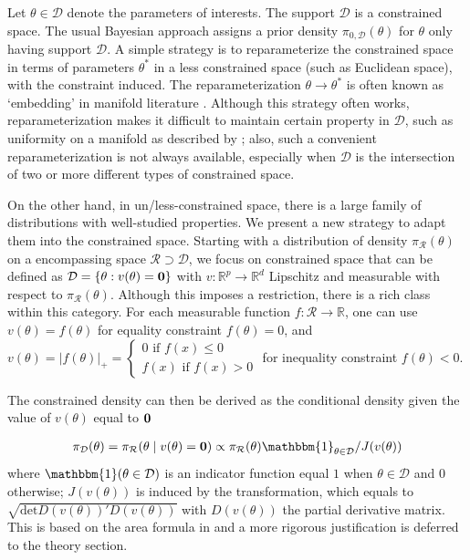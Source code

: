 \documentclass[10pt]{article}
\newcommand{\be}{\begin{equation}\begin{aligned}}
\newcommand{\ee}{\end{aligned}\end{equation}}
\newcommand{\bb}[1]{\mathbb{#1}}
\newcommand{\mc}[1]{\mathcal{#1}}
\DeclareMathOperator{\1}{\mathbbm{1}}
\begin{document}
Let $\theta \in \mc D$ denote the parameters of interests. The support $\mc
D$ is a constrained space. The usual Bayesian approach assigns a prior
density $\pi_{0,\mc D}(\theta)$ for $\theta$ only having support $\mc D$. A
simple strategy is to reparameterize the constrained space in terms of
parameters $\theta^*$ in a less constrained space (such as Euclidean
space), with the constraint induced. The reparameterization
$\theta\rightarrow\theta^*$ is often known as `embedding' in manifold
literature \citep{nash1954c1,nash1956imbedding}.  Although this strategy
often works, reparameterization makes it difficult to maintain certain
property in $\mc D$, such as uniformity on a manifold as described by
\cite{diaconis2013manifold}; also, such a convenient reparameterization is
not always available, especially when $\mc D$ is the intersection of two or
more different types of constrained space.

On the other hand, in un/less-constrained space, there is a large family of
distributions  with well-studied properties. We present a new strategy to
adapt them into the constrained space. Starting with a distribution of
density $\pi_{\mc R}(\theta)$ on a encompassing space $\mc R\supset \mc D$,
we focus on constrained space that can be defined as $\mc D =\{\theta:
v(\theta)={\bf 0}\}$ with $v: \bb{R}^p\rightarrow \bb  R^d$ Lipschitz and
measurable with respect to $\pi_{\mc R}(\theta)$. Although this imposes a
restriction, there is a rich class within this category. For each
measurable function $f:\mc R\rightarrow \bb R$, one can use
$v(\theta)=f(\theta)$ for equality constraint $f(\theta)=0$, and
$v(\theta)=|f(\theta)|_+=\left\{\begin{array}{cc}  0 \text{ if } f(x)\le 0
\\ f(x) \text{ if } f(x)> 0\end{array}\right.$ for inequality constraint
$f(\theta)<0$.

The constrained density can then be derived as the conditional density given the
value of $v(\theta)$ equal to $\bf 0$

\be
\pi_{\mc D}(\theta)=\pi_{\mc R}(\theta\mid v(\theta)={\bf 0})\propto \pi_{\mc R}(\theta) \mathbbm{1}_{\theta\in \mc
D}/J(v(\theta))
\ee
where $\mathbbm{1}(\theta\in\mc D)$ is an indicator function equal $1$ when
$\theta\in \mc D$ and $0$ otherwise; $J(v(\theta))$ is induced by the
transformation, which equals to
$\sqrt{\mbox{det}D(v(\theta))'
D(v(\theta))}$ with $D(v(\theta))$ the partial derivative matrix. This is based on the area
formula in \citep{federer2014geometric} and a more rigorous justification
is deferred to the theory section.
\end{document}
